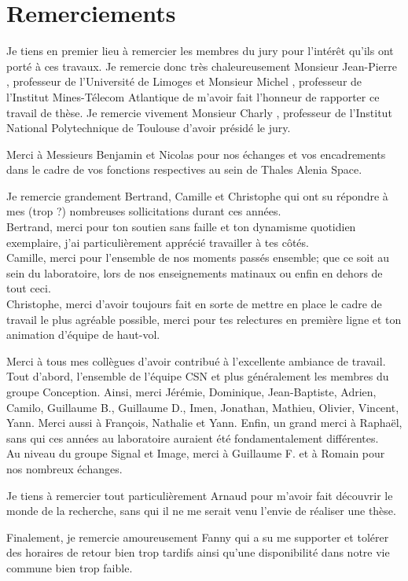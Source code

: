 {}
\chapter*{Remerciements}

Je tiens en premier lieu à remercier les membres du jury pour l'intérêt qu'ils ont porté à ces travaux. Je remercie donc 
très chaleureusement Monsieur Jean-Pierre , professeur de l'Université de Limoges et Monsieur Michel 
, professeur de l'Institut Mines-Télecom Atlantique de m'avoir fait l'honneur de rapporter ce travail de thèse.
Je remercie vivement Monsieur Charly , professeur de l'Institut National Polytechnique de Toulouse 
d'avoir présidé le jury.


Merci à Messieurs Benjamin  et Nicolas  pour nos échanges et vos encadrements
dans le cadre de vos fonctions respectives au sein de Thales Alenia Space.

Je remercie grandement Bertrand, Camille et Christophe qui ont su répondre à mes (trop ?) nombreuses sollicitations durant
ces années.\\
Bertrand, merci pour ton soutien sans faille et ton dynamisme quotidien exemplaire, j'ai particulièrement apprécié travailler
à tes côtés. \\
Camille, merci pour l'ensemble de nos moments passés ensemble; que ce soit au sein du laboratoire, lors de nos 
enseignements matinaux ou enfin en dehors de tout ceci.\\
Christophe, merci d'avoir toujours fait en sorte de mettre en place le cadre de travail le plus agréable possible, merci 
pour tes relectures en première ligne et ton animation d'équipe de haut-vol.

Merci à tous mes collègues d'avoir contribué à l'excellente ambiance de travail. Tout d'abord, l'ensemble de l'équipe CSN
et plus généralement les membres du groupe Conception. Ainsi, merci Jérémie, Dominique, Jean-Baptiste, Adrien, Camilo, 
Guillaume B., Guillaume D., Imen, Jonathan, Mathieu, Olivier, Vincent, Yann.  Merci aussi à François, Nathalie et Yann.
Enfin, un grand merci à Raphaël, sans qui ces années au laboratoire auraient été fondamentalement différentes.\\
Au niveau du groupe Signal et Image, merci à Guillaume F. et à Romain pour nos nombreux échanges.

Je tiens à remercier tout particulièrement Arnaud pour m'avoir fait découvrir le monde de la recherche, sans qui il ne me serait
venu l'envie de réaliser une thèse.

Finalement, je remercie amoureusement Fanny qui a su me supporter et tolérer des horaires de retour bien trop tardifs 
ainsi qu'une disponibilité dans notre vie commune bien trop faible.
